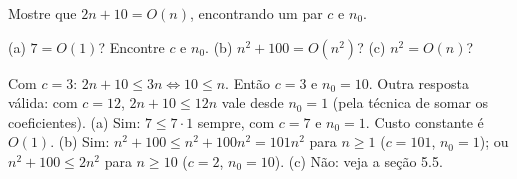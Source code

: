 \begin{exrapido}
Mostre que $2n + 10 = O(n)$, encontrando um par $c$ e $n_0$.
\end{exrapido}

\begin{exrapido}
(a) $7 = O(1)$? Encontre $c$ e $n_0$. (b) $n^2 + 100 = O(n^2)$? (c) $n^2 = O(n)$?
\end{exrapido}

\begin{respostas}
   Com $c = 3$: $2n + 10 \le 3n \Longleftrightarrow 10 \le n$. Então $c = 3$ e $n_0 = 10$.
  Outra resposta válida: com $c = 12$, $2n + 10 \le 12n$ vale desde $n_0 = 1$ (pela técnica de
  somar os coeficientes).
   (a) Sim: $7 \le 7 \cdot 1$ sempre, com $c = 7$ e $n_0 = 1$. Custo constante é $O(1)$.
  (b) Sim: $n^2 + 100 \le n^2 + 100n^2 = 101n^2$ para $n \ge 1$ ($c = 101$, $n_0 = 1$); ou
  $n^2 + 100 \le 2n^2$ para $n \ge 10$ ($c = 2$, $n_0 = 10$). (c) Não: veja a seção 5.5.
\end{respostas}
